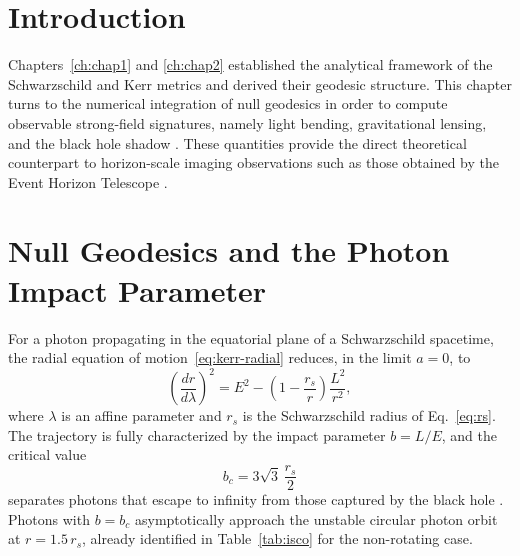 \cleardoublepage
{}
{}
\ChapterHeader

\section{Introduction}
\label{ch:chap3}
Chapters~\ref{ch:chap1} and \ref{ch:chap2} established the analytical framework of the Schwarzschild and Kerr metrics and derived their geodesic structure. This chapter turns to the numerical integration of null geodesics in order to compute observable strong-field signatures, namely light bending, gravitational lensing, and the black hole shadow \cite{luminet1979}. These quantities provide the direct theoretical counterpart to horizon-scale imaging observations such as those obtained by the Event Horizon Telescope \cite{eht2019}.

\section{Null Geodesics and the Photon Impact Parameter}

For a photon propagating in the equatorial plane of a Schwarzschild spacetime, the radial equation of motion~\eqref{eq:kerr-radial} reduces, in the limit $a=0$, to
\begin{equation}
	\left(\frac{dr}{d\lambda}\right)^2 = E^2 - \left(1-\frac{r_s}{r}\right)\frac{L^2}{r^2},
	\label{eq:photon-radial}
\end{equation}
where $\lambda$ is an affine parameter and $r_s$ is the Schwarzschild radius of Eq.~\eqref{eq:rs}. The trajectory is fully characterized by the impact parameter $b=L/E$, and the critical value
\begin{equation}
	b_c = 3\sqrt{3}\,\frac{r_s}{2}
	\label{eq:critical-impact}
\end{equation}
separates photons that escape to infinity from those captured by the black hole \cite{chandrasekhar1983}. Photons with $b=b_c$ asymptotically approach the unstable circular photon orbit at $r=1.5\,r_s$, already identified in Table~\ref{tab:isco} for the non-rotating case.

